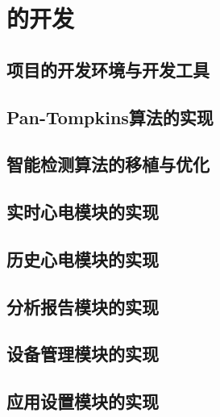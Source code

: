 \chapter{\app 的开发}\label{ch:dev}


\section{项目的开发环境与开发工具}\label{sec:env}



\section{Pan-Tompkins算法的实现}\label{sec:pan-tompkins}



\section{智能检测算法的移植与优化}\label{sec:ai}



\section{实时心电模块的实现}\label{sec:real-time}



\section{历史心电模块的实现}\label{sec:history}



\section{分析报告模块的实现}\label{sec:analytics}



\section{设备管理模块的实现}\label{sec:device}



\section{应用设置模块的实现}\label{sec:settings}

